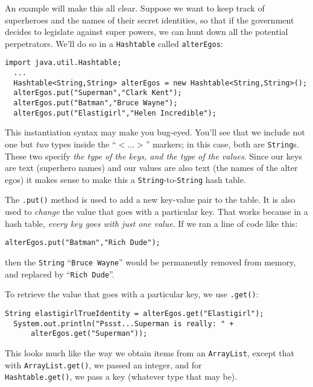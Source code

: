An example will make this all clear. Suppose we want to keep track of
superheroes and the names of their secret identities, so that if the
government decides to legislate against super powers, we can hunt down all the
potential perpetrators. We'll do so in a \texttt{Hashtable} called
\texttt{alterEgos}:

\begin{Verbatim}[fontsize=\scriptsize,samepage=true,frame=single]
  import java.util.Hashtable;
  ...
  Hashtable<String,String> alterEgos = new Hashtable<String,String>();
  alterEgos.put("Superman","Clark Kent");
  alterEgos.put("Batman","Bruce Wayne");
  alterEgos.put("Elastigirl","Helen Incredible");
\end{Verbatim}

This instantiation syntax may make you bug-eyed. You'll see that we include
not one but \textit{two} types inside the ``$<...>$'' markers; in this
case, both are \texttt{String}s. These two specify \textit{the type of the
keys, and the type of the values}. Since our keys are text (superhero names)
and our values are also text (the names of the alter egos) it makes sense to
make this a \texttt{String}-to-\texttt{String} hash table.

The \texttt{.put()} method is used to add a new key-value pair to the table.
It is also used to \textit{change} the value that goes with a particular key.
That works because in a hash table, \textit{every key goes with just one
value}. If we ran a line of code like this:

\begin{Verbatim}[fontsize=\footnotesize,samepage=true,frame=single]
  alterEgos.put("Batman","Rich Dude");
\end{Verbatim}

then the \texttt{String} ``\texttt{Bruce Wayne}'' would be permanently removed
from memory, and replaced by ``\texttt{Rich Dude}''.

To retrieve the value that goes with a particular key, we use \texttt{.get()}:

\begin{Verbatim}[fontsize=\footnotesize,samepage=true,frame=single]
  String elastigirlTrueIdentity = alterEgos.get("Elastigirl");
  System.out.println("Pssst...Superman is really: " + 
      alterEgos.get("Superman"));
\end{Verbatim}

This looks much like the way we obtain items from an \texttt{ArrayList},
except that with \texttt{ArrayList.get()}, we passed an integer, and for\\
\texttt{Hashtable.get()}, we pass a key (whatever type that may be).

